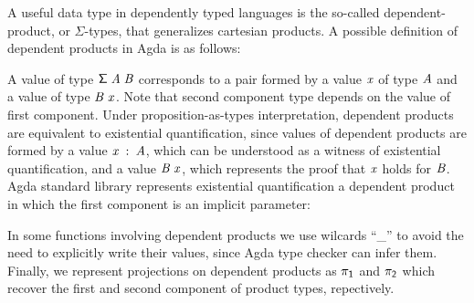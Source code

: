 \documentclass[sigplan, anonymous, review]{acmart}
\makeatletter
\newcommand{\anonymous}{\kern0.06em \vbox{\hrule\@width.5em}}
\def\resethooks{%
  \global\let\SaveRestoreHook\empty
  \global\let\ColumnHook\empty}
\newcommand{\hsindent}[1]{\quad}%
\let\hspre\empty
\let\hspost\empty
\theoremstyle{definition}
\newcommand{\D}[1]{\blue{\mathsf{#1}}}
\newcommand{\C}[1]{\red{\mathsf{#1}}}
\newcommand{\F}[1]{\green{\mathsf{#1}}}
\newcommand{\V}[1]{\purple{\mathit{#1}}}
\makeatother
\begin{document}
A useful data type in dependently typed languages is the so-called dependent-product,
or $\Sigma$-types, that generalizes cartesian products. A possible definition of dependent products 
in Agda is as follows:
\resethooks
A value of type \ensuremath{\D{\Sigma}\;\V{A}\;\V{B}} corresponds to a pair formed by a value \ensuremath{\V{x}} of type \ensuremath{\V{A}} and 
a value of type \ensuremath{\V{B}\;\V{x}}. Note that second component type depends on the value of first 
component. Under proposition-as-types interpretation, dependent products are equivalent
to existential quantification, since values of dependent products are formed by a value \ensuremath{\V{x}\;\mathbin{:}\;\V{A}},
which can be understood as a witness of existential quantification, and a value \ensuremath{\V{B}\;\V{x}}, which
represents the proof that \ensuremath{\V{x}} holds for \ensuremath{\V{B}}. Agda standard library represents existential
quantification a dependent product in which the first component is an implicit parameter:
\resethooks
In some functions involving dependent products we use wilcards ``\_'' to avoid the need to
explicitly write their values, since Agda type checker can infer them.
Finally, we represent projections on dependent products as \ensuremath{\F{\pi_1}} and \ensuremath{\F{\pi_2}} which recover the first
and second component of product types, repectively.
\end{document}
